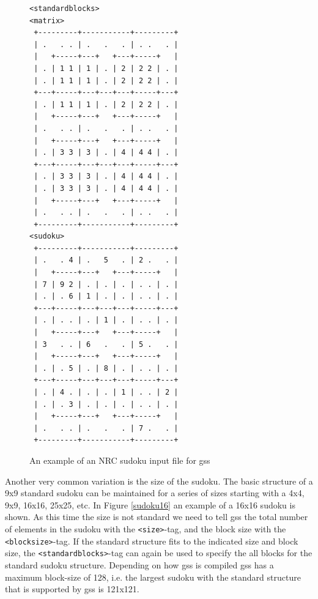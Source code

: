 \documentclass[12pt]{article}
\begin{document}
\begin{figure}
\begin{verbatim}
<standardblocks>
<matrix>
 +---------+-----------+---------+ 
 | .   . . | .   .   . | . .   . |
 |   +-----+---+   +---+-----+   |       
 | . | 1 1 | 1 | . | 2 | 2 2 | . |
 | . | 1 1 | 1 | . | 2 | 2 2 | . |
 +---+-----+---+---+---+-----+---+ 
 | . | 1 1 | 1 | . | 2 | 2 2 | . |
 |   +-----+---+   +---+-----+   |   
 | .   . . | .   .   . | . .   . |
 |   +-----+---+   +---+-----+   |       
 | . | 3 3 | 3 | . | 4 | 4 4 | . |
 +---+-----+---+---+---+-----+---+ 
 | . | 3 3 | 3 | . | 4 | 4 4 | . |
 | . | 3 3 | 3 | . | 4 | 4 4 | . |
 |   +-----+---+   +---+-----+   |  
 | .   . . | .   .   . | . .   . |
 +---------+-----------+---------+
<sudoku>
 +---------+-----------+---------+ 
 | .   . 4 | .   5   . | 2 .   . |
 |   +-----+---+   +---+-----+   |       
 | 7 | 9 2 | . | . | . | . . | . |
 | . | . 6 | 1 | . | . | . . | . |
 +---+-----+---+---+---+-----+---+ 
 | . | . . | . | 1 | . | . . | . |
 |   +-----+---+   +---+-----+   |   
 | 3   . . | 6   .   . | 5 .   . |
 |   +-----+---+   +---+-----+   |       
 | . | . 5 | . | 8 | . | . . | . |
 +---+-----+---+---+---+-----+---+ 
 | . | 4 . | . | . | 1 | . . | 2 |
 | . | . 3 | . | . | . | . . | . |
 |   +-----+---+   +---+-----+   |  
 | .   . . | .   .   . | 7 .   . |
 +---------+-----------+---------+
\end{verbatim}
\caption{\label{nrcsudoku}An example of an NRC sudoku input file for gss}
\end{figure}


Another very common variation is the size of the sudoku. The basic structure of a 9x9 standard sudoku can be maintained for a series of sizes starting with a 4x4, 9x9, 16x16, 25x25, etc. In Figure \ref{sudoku16} an example of a 16x16 sudoku is shown. As this time the size is not standard we need to tell gss the total number of elements in the sudoku with the \verb,<size>,-tag, and the block size with the \verb,<blocksize>,-tag. If the standard structure fits to the indicated size and block size, the \verb,<standardblocks>,-tag can again be used to specify the all blocks for the standard sudoku structure. Depending on how gss is compiled gss has a maximum block-size of 128, i.e. the largest sudoku with the standard structure that is supported by gss is 121x121.
\end{document}
